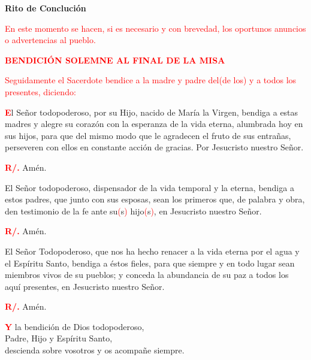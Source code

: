 \documentclass[12pt, letterpaper, spanish]{article}
\begin{document}
  \begin{center}
    \Huge {\bfseries Rito de Concluci\'on}
  \end{center}

  \large{\textcolor{red}{En este momento se hacen, si es necesario y con brevedad, los oportunos anuncios o advertencias al pueblo.}}

  \Large {\bfseries \textcolor{red}{BENDICI\'ON SOLEMNE AL FINAL DE LA MISA}}

  \large{\textcolor{red}{Seguidamente el Sacerdote bendice a la madre y padre del(de los) y a todos los presentes, diciendo:}}
  
  \lettrine[lines=2]{\bfseries \textcolor{red}{E}}{}\Large l Se\~nor todopoderoso, por su Hijo, nacido de Mar\'ia la Virgen, bendiga a estas madres y alegre su coraz\'on con la esperanza de la vida eterna, alumbrada hoy en sus hijos, para que del mismo modo que le agradecen el fruto de sus entra\~nas, perseveren con ellos en constante acci\'on de gracias. Por Jesucristo nuestro Se\~nor.

  \noindent
  \Large {\bfseries \textcolor{red}{R/.}} \hspace{0.5cm} Am\'en.

  \noindent
  \Large El Se\~nor todopoderoso, dispensador de la vida temporal y la eterna, bendiga a estos padres, que junto con sus esposas, sean los primeros que, de palabra y obra, den testimonio de la fe ante su\textcolor{red}{(}s\textcolor{red}{)} hijo\textcolor{red}{(}s\textcolor{red}{)}, en Jesucristo nuestro Se\~nor.

  \noindent
  \Large {\bfseries \textcolor{red}{R/.}} \hspace{0.5cm} Am\'en.

  \noindent
  \Large El Se\~nor Todopoderoso, que nos ha hecho renacer a la vida eterna por el agua y el Esp\'iritu Santo, bendiga a \'estos fieles, para que siempre y en todo lugar sean miembros vivos de su pueblos; y conceda la abundancia de su paz a todos los aqu\'i presentes, en Jesucristo nuestro Se\~nor.

  \noindent
  \Large {\bfseries \textcolor{red}{R/.}} \hspace{0.5cm} Am\'en.

  \clearpage

  \lettrine[lines=2]{\bfseries \textcolor{red}{Y}}{} \Large la bendici\'on de Dios todopoderoso, \\
  Padre, Hijo \Huge{\textcolor{red}{}} \Large y Esp\'iritu Santo, \\
  descienda sobre vosotros y os acompa\~ne siempre.
\end{document}
